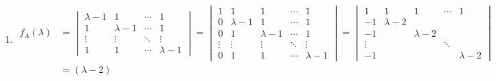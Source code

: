 	 \paragraph{} %
		 \begin{enumerate}
			 \item %
			       \begin{align*}
				       f_{A}(\lambda)
				        & = \begin{vmatrix}
					            \lambda - 1 & 1           & \cdots & 1           \\
					            1           & \lambda - 1 & \cdots & 1           \\
					            \vdots      & \vdots      & \ddots & \vdots      \\
					            1           & 1           & \cdots & \lambda - 1
				            \end{vmatrix} = \begin{vmatrix}
					                            1      & 1           & 1           & \cdots & 1           \\
					                            0      & \lambda - 1 & 1           & \cdots & 1           \\
					                            0      & 1           & \lambda - 1 & \cdots & 1           \\
					                            \vdots & \vdots      & \vdots      & \ddots & \vdots      \\
					                            0      & 1           & 1           & \cdots & \lambda - 1
				                            \end{vmatrix} = \begin{vmatrix}
					                                            1      & 1         & 1         & \cdots & 1         \\
					                                            -1     & \lambda-2 &           &        &           \\
					                                            -1     &           & \lambda-2 &        &           \\
					                                            \vdots &           &           & \ddots &           \\
					                                            -1     &           &           &        & \lambda-2
				                                            \end{vmatrix} \\
				        & = (\lambda - 2)

\end{align*}
\end{enumerate}
